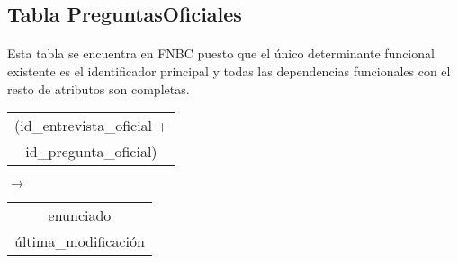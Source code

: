 \subsection{Tabla PreguntasOficiales}

  \paragraph{}Esta tabla se encuentra en FNBC puesto que el único determinante
  funcional existente es el identificador principal y todas las dependencias
  funcionales con el resto de atributos son completas.

  \begin{center}
    \begin{minipage}{4.5cm}{\begin{flushright}\begin{tabular}{ | c | }
                  \hline
                  (id\_entrevista\_oficial + \\
                  id\_pregunta\_oficial) \\
                  \hline
                 \end{tabular}\end{flushright} }
    \end{minipage}
    \begin{minipage}{0.7cm}{$\longrightarrow$}
    \end{minipage}
    \begin{minipage}{5.9cm}{\begin{tabular}{ | c | }
                  \hline
                  enunciado \\
                  última\_modificación \\
                  \hline
                 \end{tabular} }
    \end{minipage}
  \end{center}
